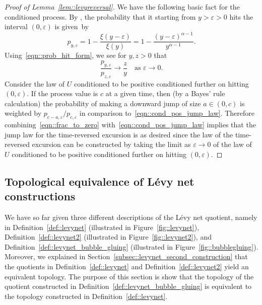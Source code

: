 \documentclass[10pt]{amsart}
\let\epsilon\varepsilon
\theoremstyle{plain}
\numberwithin{theorem}{section}
\theoremstyle{definition}
\begin{document}
\begin{proof}[Proof of Lemma~\ref{lem::levyreversal}]
We have the following basic fact for the conditioned process. By \cite[Chap.\,VII, Lem.\,12]{bertoinlevybook}, the probability that it starting from $y\!>\!\epsilon\!>\!0$ hits the interval $(0,\epsilon)$ is given~by\vspace*{-5pt}\enlargethispage{.5\baselineskip}%
\begin{equation}
\label{eqn::prob_hit_form}
p_{y,\epsilon} = 1-\frac{\xi(y-\epsilon)}{\xi(y)} = 1 - \frac{(y-\epsilon)^{\alpha-1}}{y^{\alpha-1}}.
\end{equation}
Using~\eqref{eqn::prob_hit_form}, we see for $y,z > 0$ that\vspace*{-3pt}
\begin{equation}
\label{eqn::frac_to_zero}
\frac{p_{y,\epsilon}}{p_{z,\epsilon}} \to \frac{z}{y} \quad\text{as $\textstyle \epsilon \to 0$}.
\end{equation}
Consider the law of $U$ conditioned to be positive conditioned further on hitting $(0,\epsilon)$. If the process value is $c$ at a given time, then (by a Bayes' rule calculation) the probability of making a downward jump of size $a \in (0,c)$ is weighted by $p_{c-a,\epsilon}/p_{c,\epsilon}$ in comparison to~\eqref{eqn::cond_pos_jump_law}. Therefore combining~\eqref{eqn::frac_to_zero} with~\eqref{eqn::cond_pos_jump_law} implies that the jump law for the time-reversed excursion is as desired since the law of the time-reversed excursion can be constructed by taking the limit as $\epsilon \to 0$ of the law of $U$ conditioned to be positive conditioned further on hitting $(0,\epsilon)$.
\end{proof}

\subsection{Topological equivalence of Lévy net constructions}
\label{subsec::levy_net_top_equiv}

We have so far given three different descriptions of the Lévy net quotient, namely in Definition~\ref{def::levynet} (illustrated in Figure~\ref{fig::levynet}), Definition~\ref{def::levynet2} (illustrated in Figure~\ref{fig::levynet2}), and Definition~\ref{def::levynet_bubble_gluing} (illustrated in Figure~\ref{fig::bubblegluing}). Moreover, we explained in Section~\ref{subsec::levynet_second_construction} that the quotients in Definition~\ref{def::levynet} and Definition~\ref{def::levynet2} yield an equivalent topology. The purpose of this section is show that the topology of the quotient constructed in Definition~\ref{def::levynet_bubble_gluing} is equivalent to the topology constructed in Definition~\ref{def::levynet}.
\end{document}
